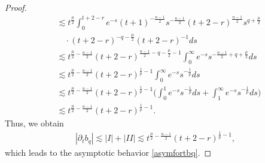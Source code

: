 \documentclass[10pt,a4paper]{amsart}
\begin{document}
\begin{proof}
\begin{equation}
\begin{aligned}
&\lesssim t^{\frac{\mu}{2}}\int_{0}^{t+2-r}e^{-s}(t+1)^{-\frac{n-1}{2}}s^{-\frac{n-1}{2}}(t+2-r)^{\frac{n-1}{2}}s^{q+\frac{\mu}{2}}\\
&\quad\cdot(t+2-r)^{-q-\frac{\mu}{2}}(t+2-r)^{-1}ds\\
&\lesssim t^{\frac{\mu}{2}-\frac{n-1}{2}}(t+2-r)^{\frac{n-1}{2}-q-\frac{\mu}{2}-1}\int_{0}^{\infty}e^{-s}s^{-\frac{n-1}{2}+q+\frac{\mu}{2}}ds\\
&\lesssim t^{\frac{\mu}{2}-\frac{n-1}{2}}(t+2-r)^{\frac{1}{p}-1}\int_{0}^{\infty}e^{-s}s^{-\frac{1}{p}}ds\\
&\lesssim t^{\frac{\mu}{2}-\frac{n-1}{2}}(t+2-r)^{\frac{1}{p}-1}\bigg(\int_{0}^{1}e^{-s}s^{-\frac{1}{p}}ds+\int_{1}^{\infty}e^{-s}s^{-\frac{1}{p}}ds\bigg)\\
&\lesssim t^{\frac{\mu}{2}-\frac{n-1}{2}}(t+2-r)^{\frac{1}{p}-1}.
\end{aligned}
\end{equation}
Thus, we obtain
\begin{equation}
\begin{aligned}
|\partial_tb_q|\lesssim |I|+|II|\lesssim t^{\frac{\mu}{2}-\frac{n-1}{2}}(t+2-r)^{\frac{1}{p}-1},
\end{aligned}
\end{equation}
which leads to the asymptotic behavior \eqref{asymfortbq}.
\end{proof}
\end{document}
